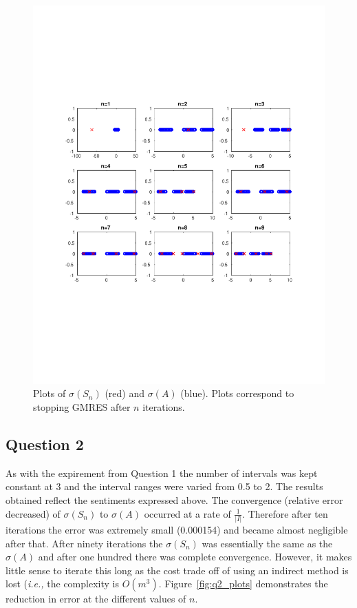 \begin{figure}[t]
  \centering
  \includegraphics[trim=10mm 70mm 10mm 70mm, width=1.0\textwidth]{../q1_plots}
  \caption{Plots of \(\sigma (S_n)\) (red) and  \(\sigma (A)\) (blue). Plots correspond to stopping GMRES after \(n\) iterations.}
  \label{fig:q1_plots}
\end{figure}

\newpage
\subsection{Question 2}



\newpage


As with the expirement from Question 1 the number of intervals was kept constant at 3 and the interval ranges were varied from 0.5 to 2.
The results obtained reflect the sentiments expressed above.
The convergence (relative error decreased) of \(\sigma (S_n)\) to \(\sigma (A)\) occurred at a rate of \(\frac{1}{|I|}\).
Therefore after ten iterations the error was extremely small (0.000154) and became almost negligible after that.
After ninety iterations the \(\sigma (S_n)\) was essentially the same as the \(\sigma (A)\) and after one hundred there was complete convergence.
However, it makes little sense to iterate this long as the cost trade off of using an indirect method is lost ({\em i.e.,} the complexity is \(O(m^3)\).
Figure~\ref{fig:q2_plots} demonstrates the reduction in error at the different values of \(n\).

